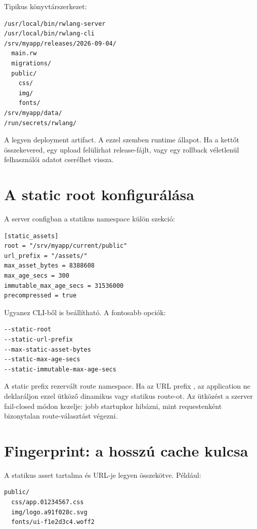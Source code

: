 Tipikus könyvtárszerkezet:

\begin{lstlisting}
/usr/local/bin/rwlang-server
/usr/local/bin/rwlang-cli
/srv/myapp/releases/2026-09-04/
  main.rw
  migrations/
  public/
    css/
    img/
    fonts/
/srv/myapp/data/
/run/secrets/rwlang/
\end{lstlisting}

A  legyen deployment artifact. A  ezzel szemben runtime állapot. Ha a kettőt összekevered, egy upload felülírhat release-fájlt, vagy egy rollback véletlenül felhasználói adatot cserélhet vissza.

\section{A static root konfigurálása}

A server configban a statikus namespace külön szekció:

\begin{lstlisting}
[static_assets]
root = "/srv/myapp/current/public"
url_prefix = "/assets/"
max_asset_bytes = 8388608
max_age_secs = 300
immutable_max_age_secs = 31536000
precompressed = true
\end{lstlisting}

Ugyanez CLI-ből is beállítható. A fontosabb opciók:

\begin{lstlisting}
--static-root
--static-url-prefix
--max-static-asset-bytes
--static-max-age-secs
--static-immutable-max-age-secs
\end{lstlisting}

A static prefix rezervált route namespace. Ha az URL prefix , az application ne deklaráljon ezzel ütköző dinamikus vagy statikus route-ot. Az ütközést a szerver fail-closed módon kezelje: jobb startupkor hibázni, mint requestenként bizonytalan route-választást végezni.

\section{Fingerprint: a hosszú cache kulcsa}

A statikus asset tartalma és URL-je legyen összekötve. Például:

\begin{lstlisting}
public/
  css/app.01234567.css
  img/logo.a91f028c.svg
  fonts/ui-f1e2d3c4.woff2
\end{lstlisting}

